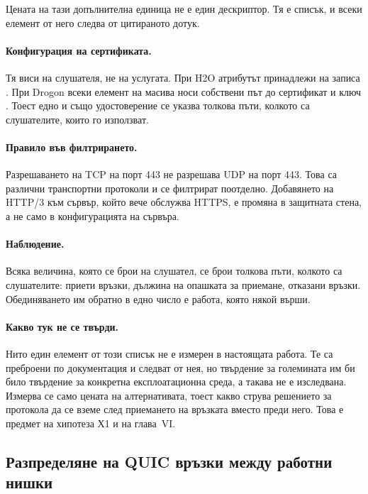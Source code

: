 Цената на тази допълнителна единица не е един дескриптор. Тя е списък, и всеки елемент от
него следва от цитираното дотук.

\paragraph{Конфигурация на сертификата.} Тя виси на слушателя, не на услугата. При H2O
атрибутът  принадлежи на записа  \cite{h2olisten}. При Drogon всеки
елемент на масива  носи собствени път до сертификат и ключ
\cite{drogonconfig}. Тоест едно и също удостоверение се указва толкова пъти, колкото са
слушателите, които го използват.

\paragraph{Правило във филтрирането.} Разрешаването на TCP на порт 443 не разрешава UDP на
порт 443. Това са различни транспортни протоколи и се филтрират поотделно. Добавянето на
HTTP/3 към сървър, който вече обслужва HTTPS, е промяна в защитната стена, а не само в
конфигурацията на сървъра.

\paragraph{Наблюдение.} Всяка величина, която се брои на слушател, се брои толкова пъти,
колкото са слушателите: приети връзки, дължина на опашката за приемане, отказани връзки.
Обединяването им обратно в едно число е работа, която някой върши.

\paragraph{Какво тук не се твърди.} Нито един елемент от този списък не е измерен в настоящата
работа. Те са преброени по документация и следват от нея, но твърдение за големината им би
било твърдение за конкретна експлоатационна среда, а такава не е изследвана. Измерва се само
цената на алтернативата, тоест какво струва решението за протокола да се вземе след
приемането на връзката вместо преди него. Това е предмет на хипотеза Х1 и на глава~VI.

\subsection{Разпределяне на QUIC връзки между работни нишки}
\label{sec:quicgap}

